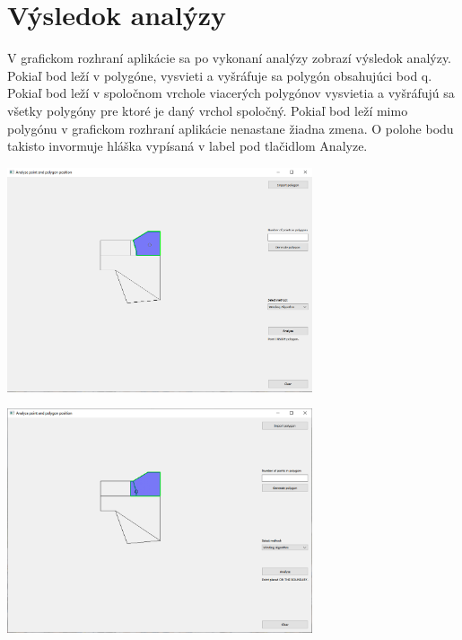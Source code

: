 \documentclass[12pt]{article}
\begin{document}
\section{Výsledok analýzy}
V grafickom rozhraní aplikácie sa po vykonaní analýzy zobrazí výsledok analýzy. Pokiaľ bod leží v polygóne, vysvieti a vyšráfuje sa polygón obsahujúci bod q. Pokiaľ bod leží v spoločnom vrchole viacerých polygónov vysvietia a vyšráfujú sa všetky polygóny pre ktoré je daný vrchol spoločný. Pokiaľ bod leží mimo polygónu v grafickom rozhraní aplikácie nenastane žiadna zmena. O polohe bodu takisto invormuje hláška vypísaná v label pod tlačidlom Analyze.

\begin{center}
   \includegraphics[width=9cm]{./img/bod_v_polygone.png}
\end{center}


\begin{center}
   \includegraphics[width=9cm]{./img/na_hrane.png}
\end{center}
\end{document}
